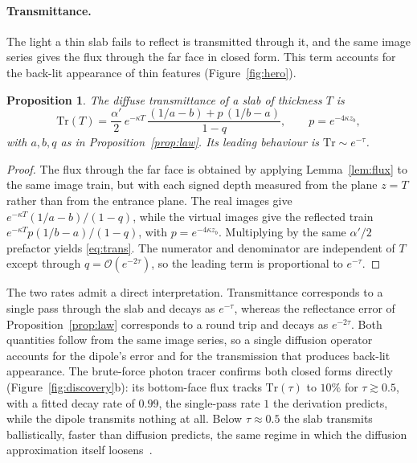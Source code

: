 \documentclass[11pt]{article}
\newtheorem{proposition}{Proposition}
\providecommand{\RTrAgree}{0}
\providecommand{\RTrRateBrute}{0.00}
\renewcommand{\RTrAgree}{10}
\renewcommand{\RTrRateBrute}{0.99}
\newcommand{\Tr}{\mathrm{Tr}}
\begin{document}
\paragraph{Transmittance.}
The light a thin slab fails to reflect is transmitted through it, and the same
image series gives the flux through the far face in closed form. This term
accounts for the back-lit appearance of thin features (Figure~\ref{fig:hero}).

\begin{proposition}
\label{prop:trans}
The diffuse transmittance of a slab of thickness $T$ is
\begin{equation}
\Tr(T)=\frac{\alpha'}{2}\,e^{-\kappa T}\,
\frac{(1/a-b)+p\,(1/b-a)}{1-q},\qquad p=e^{-4\kappa z_b},
\label{eq:trans}
\end{equation}
with $a,b,q$ as in Proposition~\ref{prop:law}. Its leading behaviour is
$\Tr\sim e^{-\tau}$.
\end{proposition}

\begin{proof}
The flux through the far face is obtained by applying
Lemma~\ref{lem:flux} to the same image train, but with each signed depth measured
from the plane $z=T$ rather than from the entrance plane. The real images give
$e^{-\kappa T}(1/a-b)/(1-q)$, while the virtual images give the reflected train
$e^{-\kappa T}p(1/b-a)/(1-q)$, with $p=e^{-4\kappa z_b}$. Multiplying by the
same $\alpha'/2$ prefactor yields \eqref{eq:trans}. The numerator and denominator
are independent of $T$ except through $q=\mathcal{O}(e^{-2\tau})$, so the leading
term is proportional to $e^{-\tau}$.
\end{proof}

The two rates admit a direct interpretation. Transmittance corresponds to a
single pass through the slab and decays as $e^{-\tau}$, whereas the reflectance
error of Proposition~\ref{prop:law} corresponds to a round trip and decays as
$e^{-2\tau}$. Both quantities follow from the same image series, so a single
diffusion operator accounts for the dipole's error and for the transmission that
produces back-lit appearance. The brute-force photon tracer confirms both closed
forms directly (Figure~\ref{fig:discovery}b): its bottom-face flux tracks
$\Tr(\tau)$ to $\RTrAgree\%$ for $\tau\gtrsim0.5$, with a fitted decay
rate of $\RTrRateBrute$, the single-pass rate $1$ the derivation predicts, while
the dipole transmits nothing at all. Below $\tau\!\approx\!0.5$ the slab transmits
ballistically, faster than diffusion predicts, the same regime in which the
diffusion approximation itself loosens~\cite{sawhney2025sota}.
\end{document}
